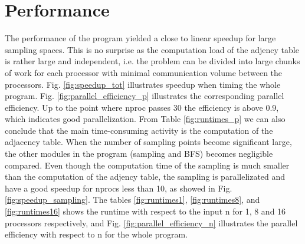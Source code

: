 
 \section{\textbf{Performance}}
The performance of the program yielded a close to linear speedup for large sampling spaces. This is no surprise as the computation load of the adjency table is rather large and independent, i.e. the problem can be divided into large chunks of work for each processor with minimal communication volume between the processors. Fig. \ref{fig:speedup_tot} illustrates speedup when timing the whole program. Fig.  \ref{fig:parallel_efficiency_p} illustrates the corresponding parallel efficiency. Up to the point where nproc passes 30 the efficiency is above 0.9, which indicates good parallelization.  From Table \ref{fig:runtimes_p} we can also conclude that the main time-consuming activity is the computation of the adjacency table. When the number of sampling points become significant large, the other modules in the program (sampling and BFS) becomes negligible compared. Even though the computation time of the sampling is much smaller than the computation of the adjency table, the sampling is parallelizated and have a good speedup for nprocs less than 10, as showed in Fig. \ref{fig:speedup_sampling}. The tables \ref{fig:runtimes1}, \ref{fig:runtimes8}, and \ref{fig:runtimes16} shows the runtime with respect to the input n for 1, 8 and 16 processors respectively, and Fig. \ref{fig:parallel_efficiency_n} illustrates the parallel efficiency with respect to n for the whole program.

